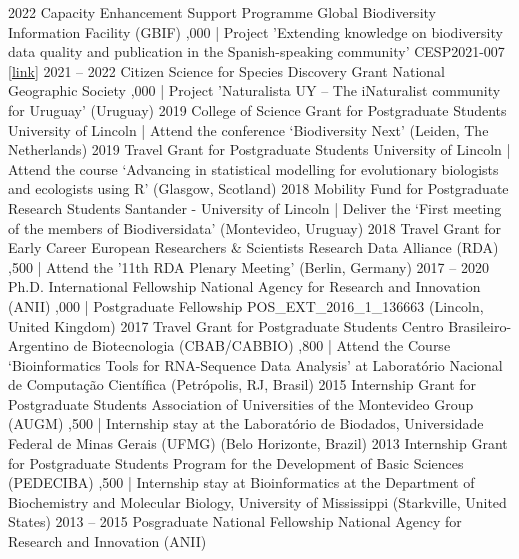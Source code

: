 \documentclass[9pt]{developercv} %
\begin{document}
\begin{entrylist}
	\entry
		{2022}
		{Capacity Enhancement Support Programme}
		{Global Biodiversity Information Facility (GBIF)}
		{,000 | Project 'Extending knowledge on biodiversity data quality and publication in the Spanish-speaking community' CESP2021-007 [\href{https://www.gbif.org/project/CESP2021-007/}{link}]}
	\entry
		{2021 -- 2022}
		{Citizen Science for Species Discovery Grant}
		{National Geographic Society}
		{,000 | Project 'Naturalista UY – The iNaturalist community for Uruguay' (Uruguay)}
	\entry
		{2019}
		{College of Science Grant for Postgraduate Students}
		{University of Lincoln }
		{ | Attend the conference ‘Biodiversity Next’ (Leiden, The Netherlands)}
	\entry
		{2019}
		{Travel Grant for Postgraduate Students}
		{University of Lincoln }
		{ | Attend the course ‘Advancing in statistical modelling for evolutionary biologists and ecologists using R’ (Glasgow, Scotland)}
	\entry
		{2018}
		{Mobility Fund for Postgraduate Research Students}
		{Santander - University of Lincoln}
		{ | Deliver the ‘First meeting of the members of Biodiversidata’ (Montevideo, Uruguay)}
	\entry
		{2018}
		{Travel Grant for Early Career European Researchers \& Scientists }
		{Research Data Alliance (RDA)}
		{,500 | Attend the '11th RDA Plenary Meeting’ (Berlin, Germany)}
	\entry
		{2017 -- 2020}
		{Ph.D. International Fellowship}
		{National Agency for Research and Innovation (ANII)}
		{,000 | Postgraduate Fellowship POS\_EXT\_2016\_1\_136663 (Lincoln, United Kingdom)}
	\entry
		{2017}
		{Travel Grant for Postgraduate Students}
		{Centro Brasileiro-Argentino de Biotecnologia (CBAB/CABBIO)}
		{,800 | Attend the Course ‘Bioinformatics Tools for RNA-Sequence Data Analysis’ at Laboratório Nacional de Computação Científica (Petrópolis, RJ, Brasil)}
	\entry
		{2015}
		{Internship Grant for Postgraduate Students}
		{Association of Universities of the Montevideo Group (AUGM)}
		{,500 | Internship stay at the Laboratório de Biodados, Universidade Federal de Minas Gerais (UFMG) (Belo Horizonte, Brazil)}
	\entry
		{2013}
		{Internship Grant for Postgraduate Students}
		{Program for the Development of Basic Sciences (PEDECIBA)}
		{,500 | Internship stay at Bioinformatics at the Department of Biochemistry and Molecular Biology, University of Mississippi (Starkville, United States)}
	\entry
		{2013 -- 2015}
		{Posgraduate National Fellowship}
		{National Agency for Research and Innovation (ANII)}

\end{entrylist}
\end{document}
